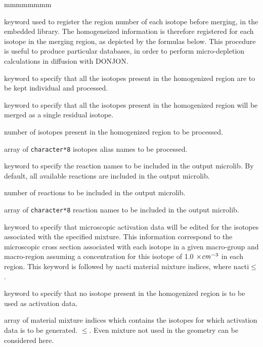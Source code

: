 \begin{ListeDeDescription}{mmmmmmmm}
\item[\moc{ALLX}] keyword used to register the region number of each isotope before merging, in the 
embedded library. The homogeneized information is therefore registered for each isotope in the merging
region, as depicted by the formulas below. This procedure is useful to produce particular databases, 
in order to perform micro-depletion calculations in diffusion with DONJON.

\item[\moc{ALL}] keyword to specify that all the isotopes present in the
homogenized region are to be kept individual and processed.

\item[\moc{RES}] keyword to specify that all the isotopes present in the
homogenized region will be merged as a single residual isotope.

\item[\dusa{nis}] number of isotopes present in the homogenized
region to be processed.

\item[\dusa{HISO}] array of {\tt character*8} isotopes alias names to be processed.

\item[\moc{REAC}] keyword to specify the reaction names to be included in the output microlib. By default, all available reactions
are included in the output microlib.

\item[\dusa{nreac}] number of reactions to be included in the output microlib.

\item[\dusa{HREAC}] array of {\tt character*8} reaction names to be included in the output microlib.

\item[\moc{ACTI}] keyword to specify that microscopic activation
data will be edited for the isotopes associated with the specified mixture. This
information correspond to the microscopic cross section associated with each
isotope in a given macro-group and macro-region assuming a concentration
for this isotope of 1.0 $\times{\it cm}^{-3}$ in each region. This keyword is
followed by nacti material mixture indices, where
nacti$\le$.

\item[\moc{NONE}] keyword to specify that no isotope present in the
homogenized region is to be used as activation data.

\item[\dusa{imixa}] array of material mixture indices which contains the
isotopes for which activation data is to be generated.
$\le$. Even mixture not used in the geometry 
can be considered here.


\end{ListeDeDescription}
